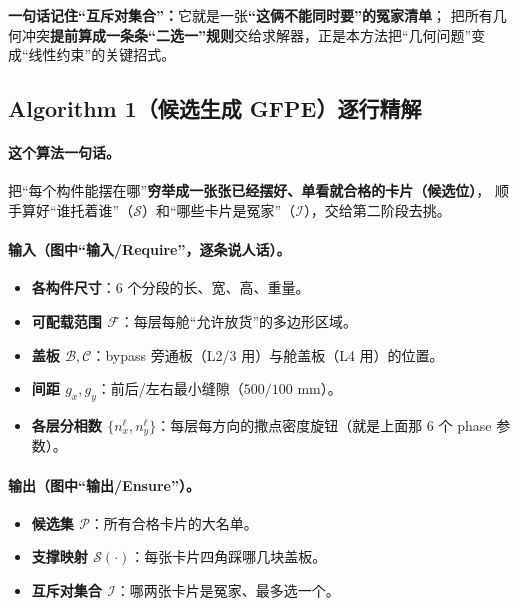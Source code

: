 \documentclass[11pt]{ctexart}
\begin{document}
\begin{key}\textbf{一句话记住“互斥对集合”：}它就是一张\textbf{“这俩不能同时要”的冤家清单}；
把所有几何冲突\textbf{提前算成一条条“二选一”规则}交给求解器，正是本方法把“几何问题”变成“线性约束”的关键招式。
\end{key}
\subsection{Algorithm 1（候选生成 GFPE）逐行精解}
\paragraph{这个算法一句话。}把“每个构件能摆在哪”\textbf{穷举成一张张已经摆好、单看就合格的卡片（候选位）}，
顺手算好“谁托着谁”（$\mathcal{S}$）和“哪些卡片是冤家”（$\mathcal{I}$），交给第二阶段去挑。

\paragraph{输入（图中“输入/Require”，逐条说人话）。}
\begin{itemize}[leftmargin=1.8em,itemsep=1pt]
  \item \textbf{各构件尺寸}：6 个分段的长、宽、高、重量。
  \item \textbf{可配载范围 $\mathcal{F}$}：每层每舱“允许放货”的多边形区域。
  \item \textbf{盖板 $\mathcal{B},\mathcal{C}$}：bypass 旁通板（L2/3 用）与舱盖板（L4 用）的位置。
  \item \textbf{间距 $g_x,g_y$}：前后/左右最小缝隙（$500/100$ mm）。
  \item \textbf{各层分相数 $\{n^\ell_x,n^\ell_y\}$}：每层每方向的撒点密度旋钮（就是上面那 6 个 phase 参数）。
\end{itemize}
\paragraph{输出（图中“输出/Ensure”）。}
\begin{itemize}[leftmargin=1.8em,itemsep=1pt]
  \item \textbf{候选集 $\mathcal{P}$}：所有合格卡片的大名单。
  \item \textbf{支撑映射 $\mathcal{S}(\cdot)$}：每张卡片四角踩哪几块盖板。
  \item \textbf{互斥对集合 $\mathcal{I}$}：哪两张卡片是冤家、最多选一个。
\end{itemize}
\end{document}
